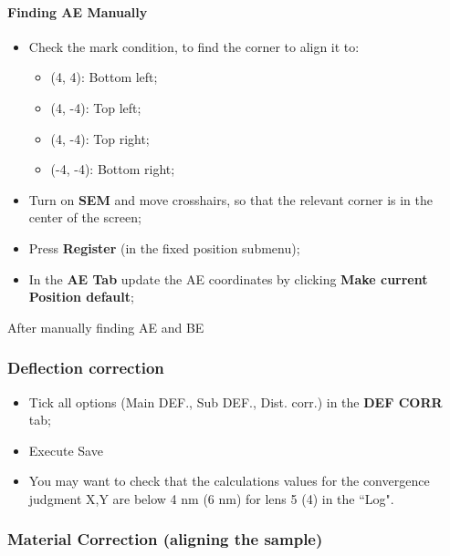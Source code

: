 \paragraph{Finding AE Manually}

\begin{itemize}
\item Check the mark condition, to find the corner to align it to:
  \begin{itemize}
  \item (4, 4): Bottom left;
  \item (4, -4): Top left;
  \item (4, -4): Top right;
  \item (-4, -4): Bottom right;
  \end{itemize}
\item Turn on  \textbf{SEM} and move crosshairs, so that  the relevant corner is
  in the center of the screen;
\item Press \textbf{Register} (in the fixed position submenu);
\item In the \textbf{AE Tab} update  the AE coordinates by clicking \textbf{Make
    current Position default};
\end{itemize}

\begin{framed}\noindent
  After manually finding AE and  BE 
\end{framed}

\subsubsection{Deflection correction}

\begin{itemize}
\item Tick all  options (Main DEF., Sub DEF., Dist.   corr.)  in the \textbf{DEF
    CORR} tab;
\item Execute \ira Save
\item You  may want to  check that the  calculations values for  the convergence
  judgment X,Y are below 4 nm (6 nm) for lens 5 (4) in the ``Log".
\end{itemize}

\subsubsection{Material Correction (aligning the sample)}
\label{sec:material-correction}

